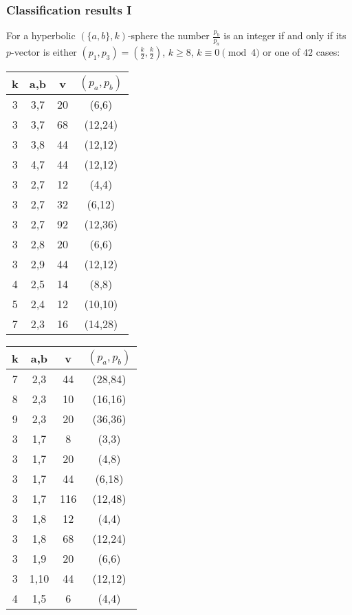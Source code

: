 \documentclass{beamer}
\begin{document}
\begin{frame}
  \frametitle{Classification results I}

For a hyperbolic $(\{a,b\},k)$-sphere the number $\frac{p_b}{p_a}$ is an integer if and only if its $p$-vector is either $(p_1, p_3)=(\frac{k}{2}, \frac{k}{2})$, $k\geq 8$, $k\equiv 0\pmod 4$ or one of $42$ cases:
  
\begin{center}
\begin{minipage}[b]{5cm}
\begin{tabular}{||c|c|c|c||}
\hline\hline
  k & a,b  & v   &$(p_a,p_b)$\\
\hline\hline
  3 & 3,7  & 20  & (6,6)   \\
  3 & 3,7  & 68  & (12,24) \\
  3 & 3,8  & 44  & (12,12) \\
  3 & 4,7  & 44  & (12,12) \\
  3 & 2,7  & 12  & (4,4)   \\
  3 & 2,7  & 32  & (6,12)  \\
  3 & 2,7  & 92  & (12,36) \\
  3 & 2,8  & 20  & (6,6)   \\
  3 & 2,9  & 44  & (12,12) \\
  4 & 2,5  & 14  & (8,8)   \\
  5 & 2,4  & 12  & (10,10) \\
  7 & 2,3  & 16  & (14,28) \\
\hline\hline
\end{tabular}
\end{minipage}
\begin{minipage}[b]{5cm}
\begin{tabular}{||c|c|c|c||}
\hline\hline
  k & a,b  & v   &$(p_a,p_b)$\\
\hline\hline
  7 & 2,3  & 44  & (28,84) \\
  8 & 2,3  & 10  & (16,16) \\
  9 & 2,3  & 20  & (36,36) \\
  3 & 1,7  & 8   & (3,3)   \\
  3 & 1,7  & 20  & (4,8)   \\
  3 & 1,7  & 44  & (6,18)  \\
  3 & 1,7  & 116 & (12,48) \\
  3 & 1,8  & 12  & (4,4)   \\
  3 & 1,8  & 68  & (12,24) \\
  3 & 1,9  & 20  & (6,6)   \\
  3 & 1,10 & 44  & (12,12) \\
  4 & 1,5  & 6   & (4,4)   \\
\hline\hline
\end{tabular}
\end{minipage}
\end{center}

\end{frame}
\end{document}

